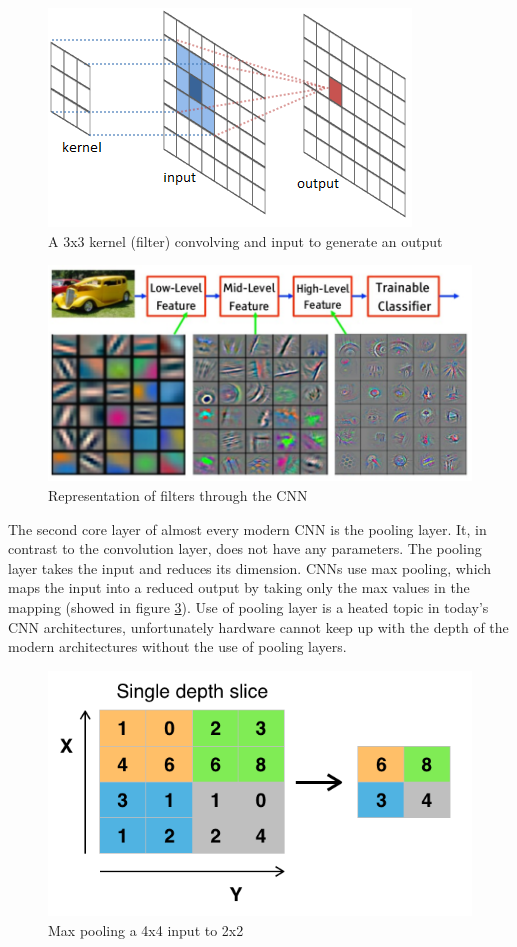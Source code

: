 \documentclass[times, utf8, diplomski]{fer}
\begin{document}
\begin{figure}
  \includegraphics{figures/conv1.png}
  \centering
  \caption{A 3x3 kernel (filter) convolving and input to generate an output}
  \label{fig:conv1}
\end{figure}

\begin{figure}
  \includegraphics[scale=1.4]{figures/filter.png}
  \centering
  \caption{Representation of filters through the CNN}
  \label{fig:filter}
\end{figure}

The second core layer of almost every modern CNN is the pooling layer. It, in contrast to the convolution layer, does not have any parameters. The pooling layer takes the input and reduces its dimension. CNNs use max pooling, which maps the input into a reduced output by taking only the max values in the mapping (showed in figure \ref{fig:pool}). Use of pooling layer is a heated topic in today's CNN architectures, unfortunately hardware cannot keep up with the depth of the modern architectures without the use of pooling layers.

\begin{figure}
  \includegraphics[scale=0.6]{figures/pool.png}
  \centering
  \caption{Max pooling a 4x4 input to 2x2}
  \label{fig:pool}
\end{figure}
\end{document}
